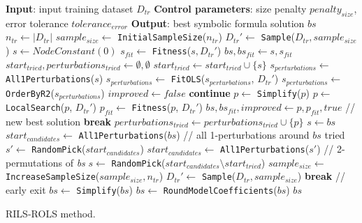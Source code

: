 \documentclass{bmcart}
\begin{document}
\begin{algorithm}
	\footnotesize

	\begin{algorithmic}[1] 
		\Statex	  \textbf{Input}: input training dataset $D_{tr}$  
		\Statex \textbf{Control parameters}: size penalty $penalty_{size}$, error tolerance $tolerance_{error}$  
		\Statex \textbf{Output}: best symbolic formula solution $bs$
		\State $n_{tr} \gets |D_{tr}|$
		\State $sample_{size} \gets $ \texttt{InitialSampleSize}($n_{tr}$)
		\State $D_{tr}' \gets$ \texttt{Sample}($D_{tr}, sample_{size}$)
		\State $s \gets NodeConstant(0)$ 
		\State $s_{fit} \gets$ \texttt{Fitness}($s, D_{tr}'$)
		\State $bs, bs_{fit} \gets s, s_{fit}$ \label{line:solSet}
		\State $start_{tried}, perturbations_{tried} \gets \emptyset, \emptyset$
		\State $start_{tried} \gets start_{tried} \cup \{s\}$
		\State $s_{perturbations} \gets $ \texttt{All1Perturbations}($s$) \label{line:sPert}
		\State $s_{perturbations} \gets $ \texttt{FitOLS}($s_{perturbations}$, $D_{tr}'$)
		\State $s_{perturbations} \gets $ \texttt{OrderByR2}($s_{perturbations}$) \label{line:orderR2}
		\State $improved \gets false $
		\State \textbf{continue}
		\EndIf
		\State $p \gets $ \texttt{Simplify}($p$) \label{line:simp}
		\State $p \gets $ \texttt{LocalSearch}($p$, $D_{tr}'$) \label{line:ls}
		\State $p_{fit} \gets$ \texttt{Fitness}($p$, $D_{tr}'$)
		 \label{line:avoid1}
		\State $bs, bs_{fit}, improved \gets p, p_{fit}, true$ // new best solution
		\State \textbf{break}
		\EndIf \label{line:avoid2}
		\State $perturbations_{tried} \gets perturbations_{tried} \cup \{p\}$
		\EndFor
		\State $s \gets bs$ \label{line:improved}
		\Else
		\State $start_{candidates} \gets $ \texttt{All1Perturbations}($bs$)
		 // all 1-perturbations around $bs$ tried
		\State $s' \gets $ \texttt{RandomPick}($start_{candidates}$)  \label{line:pert21}
		\State $start_{candidates} \gets $ \texttt{All1Perturbations}($s'$) \label{line:pert22} // 2-permutations of \textit{bs}
		\EndIf
		\State $s \gets $ \texttt{RandomPick}($start_{candidates} \setminus start_{tried}$) \label{line:randPick}
		\State $sample_{size} \gets$ \texttt{IncreaseSampleSize}($sample_{size}, n_{tr}$) \label{line:sampleAdj1}
		\State $D_{tr}' \gets$ \texttt{Sample}($D_{tr}, sample_{size}$)\label{line:sampleAdj2}
		\EndIf
		\EndIf
		\State \textbf{break} // early exit
		\EndIf
		\EndWhile
		\State $bs \gets $ \texttt{Simplify}($bs$)
		\State $bs \gets $ \texttt{RoundModelCoefficients}($bs$)
		\State \Return $bs$
		\EndProcedure
	\end{algorithmic}
	\caption{\textsc{RILS}-\textsc{ROLS}  method.}
	\label{alg:rilsrols}
\end{algorithm}  
\end{document}
